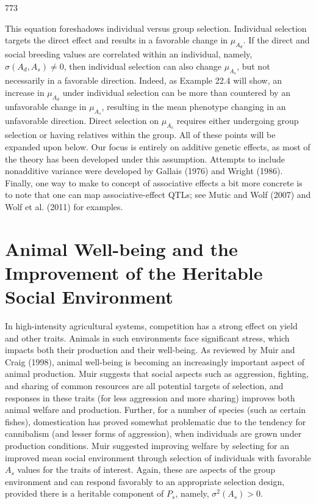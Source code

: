 \documentclass{article}
\begin{document}
773

This equation foreshadows individual versus group selection. Individual selection targets the direct effect and results in a favorable change in  $ \mu_{A_d} $. If the direct and social breeding values are correlated within an individual, namely,  $ \sigma(A_d, A_s) \neq 0 $, then individual selection can also change  $ \mu_{A_s} $, but not necessarily in a favorable direction. Indeed, as Example 22.4 will show, an increase in  $ \mu_{A_d} $ under individual selection can be more than countered by an unfavorable change in  $ \mu_{A_s} $, resulting in the mean phenotype changing in an unfavorable direction. Direct selection on  $ \mu_{A_s} $ requires either undergoing group selection or having relatives within the group. All of these points will be expanded upon below. Our focus is entirely on additive genetic effects, as most of the theory has been developed under this assumption. Attempts to include nonadditive variance were developed by Gallais (1976) and Wright (1986). Finally, one way to make to concept of associative effects a bit more concrete is to note that one can map associative-effect QTLs; see Mutic and Wolf (2007) and Wolf et al. (2011) for examples.

\section{Animal Well-being and the Improvement of the Heritable Social Environment}
In high-intensity agricultural systems, competition has a strong effect on yield and other traits. Animals in such environments face significant stress, which impacts both their production and their well-being. As reviewed by Muir and Craig (1998), animal well-being is becoming an increasingly important aspect of animal production. Muir suggests that social aspects such as aggression, fighting, and sharing of common resources are all potential targets of selection, and responses in these traits (for less aggression and more sharing) improves both animal welfare and production. Further, for a number of species (such as certain fishes), domestication has proved somewhat problematic due to the tendency for cannibalism (and lesser forms of aggression), when individuals are grown under production conditions. Muir suggested improving welfare by selecting for an improved mean social environment through selection of individuals with favorable  $ A_s $ values for the traits of interest. Again, these are aspects of the group environment and can respond favorably to an appropriate selection design, provided there is a heritable component of  $ P_s $, namely,  $ \sigma^2(A_s) > 0 $.
\end{document}
